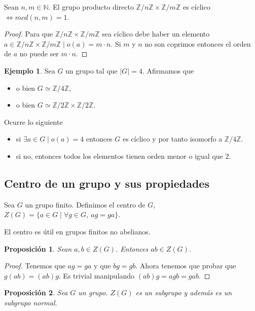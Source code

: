 \documentclass{book}
\newtheorem{pro}{Proposición}
\theoremstyle{definition}
\newtheorem{ej}{Ejemplo}
\theoremstyle{remark}
\newcommand{\isom}{\simeq}
\newcommand{\N}{\mathbb{N}}
\newcommand{\Z}{\mathbb{Z}}
\newcommand{\ZnZ}{\mathbb{Z}/n\mathbb{Z}}
\newcommand{\ZmZ}{\mathbb{Z}/m\mathbb{Z}}
\begin{document}
\begin{thm}
	Sean $n, m \in \N$. El grupo producto directo $\ZnZ \times \ZmZ$ es cíclico $\iff mcd(n,m) = 1$.
\end{thm}

\begin{proof}
	Para que $\ZnZ \times \ZmZ$ sea cíclico debe haber un elemento $a \in \ZnZ \times \ZmZ \mid o(a) = m\cdot n$. Si $m$ y $n$ no son coprimos entonces el orden de $a$ no puede ser $m\cdot n$. %
\end{proof}

\begin{ej}
Sea $G$ un grupo tal que $|G| = 4$. Afirmamos que
\begin{itemize}
	\item o bien $G \isom \Z/4\Z$,
	\item o bien $G \isom \Z/2\Z \times \Z/2\Z$.
\end{itemize}

Ocurre lo siguiente
\begin{itemize}
	\item si $\exists a \in G \mid o(a) = 4$ entonces $G$ es cíclico y por tanto isomorfo a $\Z/4\Z$.
	\item si no, entonces todos los elementos tienen orden menor o igual que 2.
\end{itemize}
\end{ej}

\subsection{Centro de un grupo y sus propiedades}

\begin{dfn}
	Sea $G$ un grupo finito. Definimos el centro de $G$, $Z(G) = \{a \in G \mid \forall g \in G,\ ag = ga\}$.
\end{dfn}

El centro es útil en grupos finitos no abelianos.

\begin{pro}
	Sean $a, b \in Z(G)$. Entonces $ab \in Z(G)$.
\end{pro}

\begin{proof}
	Tenemos que $ag = ga$ y que $bg = gb$. Ahora tenemos que probar que $g(ab) = (ab)g$. Es trivial manipulando $(ab)g = agb = gab$.
\end{proof}

\begin{pro}
	Sea $G$ un grupo. $Z(G)$ es un subgrupo y además es un subgrupo normal.
\end{pro}
\end{document}
